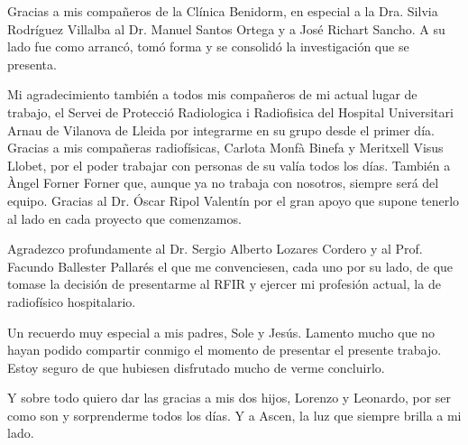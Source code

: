 \begin{flushright}
Gracias a mis compañeros de la Clínica Benidorm, en especial a la Dra. Silvia Rodríguez Villalba al Dr. Manuel Santos Ortega y a José Richart Sancho. A su lado fue como arrancó, tomó forma y se consolidó la investigación que se presenta.

Mi agradecimiento también a todos mis compañeros de mi actual lugar de trabajo, el Servei de Protecció Radiologica i Radiofisica del Hospital Universitari Arnau de Vilanova de Lleida por integrarme en su grupo desde el primer día. Gracias a mis compañeras radiofísicas, Carlota Monfà Binefa y Meritxell Visus Llobet, por el poder trabajar con personas de su valía todos los días. También a Àngel Forner Forner que, aunque ya no trabaja con nosotros, siempre será del equipo. Gracias al Dr. Óscar Ripol Valentín por el gran apoyo que supone tenerlo al lado en cada proyecto que comenzamos.

Agradezco profundamente al Dr. Sergio Alberto Lozares Cordero y al Prof. Facundo Ballester Pallarés el que me convenciesen, cada uno por su lado, de que tomase la decisión de presentarme al RFIR y ejercer mi profesión actual, la de radiofísico hospitalario.

Un recuerdo muy especial a mis padres, Sole y Jesús. Lamento mucho que no hayan podido compartir conmigo el momento de presentar el presente trabajo. Estoy seguro de que hubiesen disfrutado mucho de verme concluirlo.

Y sobre todo quiero dar las gracias a mis dos hijos, Lorenzo y Leonardo, por ser como son y sorprenderme todos los días. Y a Ascen, la luz que siempre brilla a mi lado.

\end{flushright}

\justify